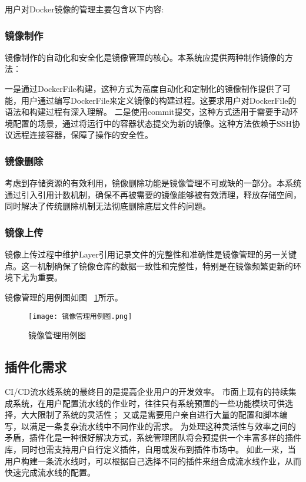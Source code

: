 用户对Docker镜像的管理主要包含以下内容:

\subsubsection{镜像制作}
镜像制作的自动化和安全化是镜像管理的核心。本系统应提供两种制作镜像的方法：

一是通过DockerFile构建，这种方式为高度自动化和定制化的镜像制作提供了可能，用户通过编写DockerFile来定义镜像的构建过程。这要求用户对DockerFile的语法和构建过程有深入理解。
二是使用commit提交，这种方式适用于需要手动环境配置的场景，通过将运行中的容器状态提交为新的镜像。这种方法依赖于SSH协议远程连接容器，保障了操作的安全性。

\subsubsection{镜像删除}
考虑到存储资源的有效利用，镜像删除功能是镜像管理不可或缺的一部分。本系统通过引入引用计数机制，确保不再被需要的镜像能够被有效清理，释放存储空间，同时解决了传统删除机制无法彻底删除底层文件的问题。

\subsubsection{镜像上传}
镜像上传过程中维护Layer引用记录文件的完整性和准确性是镜像管理的另一关键点。这一机制确保了镜像仓库的数据一致性和完整性，特别是在镜像频繁更新的环境下尤为重要。

镜像管理的用例图如图~ \ref{fig:镜像管理用例图}所示。

\begin{figure}[h]
  \centering
  \texttt{[image: 镜像管理用例图.png]}
  \caption{镜像管理用例图}
  \label{fig:镜像管理用例图}
\end{figure}

\subsection{插件化需求}
CI/CD流水线系统的最终目的是提高企业用户的开发效率。
市面上现有的持续集成系统，在用户配置流水线的作业时，往往只有系统预置的一些功能模块可供选择，大大限制了系统的灵活性；
又或是需要用户亲自进行大量的配置和脚本编写，以满足一条复杂流水线中不同作业的需求。
为处理这种灵活性与效率之间的矛盾，插件化是一种很好解决方式，系统管理团队将会预提供一个丰富多样的插件库，同时也需支持用户自行定义插件，自用或发布到插件市场中。
如此一来，当用户构建一条流水线时，可以根据自己选择不同的插件来组合成流水线作业，从而快速完成流水线的配置。

